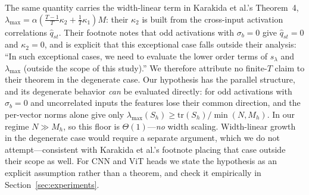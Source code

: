The same quantity carries the width-linear term in Karakida et al.'s
Theorem~4, $\lambda_{\max} = \alpha(\tfrac{T-1}{T}\kappa_2 +
\tfrac{1}{T}\kappa_1)M$: their $\kappa_2$ is built from the
cross-input activation correlations $\hat{q}_{st}$. Their footnote
notes that odd activations with $\sigma_b = 0$ give
$\hat{q}_{st} = 0$ and $\kappa_2 = 0$, and is explicit that this
exceptional case falls outside their analysis: ``In such
exceptional cases, we need to evaluate the lower order terms of
$s_\lambda$ and $\lambda_{\max}$ (outside the scope of this
study).'' We therefore attribute no finite-$T$ claim to their
theorem in the degenerate case. Our hypothesis has the parallel
structure, and its degenerate behavior \emph{can} be evaluated
directly: for odd activations with $\sigma_b = 0$ and uncorrelated
inputs the features lose their common direction, and the per-vector
norms alone give only $\lambda_{\max}(S_h) \geq
\mathrm{tr}(S_h)/\min(N, M_h)$. In our regime $N \gg M_h$, so this
floor is $\Theta(1)$---\emph{no} width scaling. Width-linear growth
in the degenerate case would require a separate argument, which we
do not attempt---consistent with Karakida et al.'s footnote placing
that case outside their scope as well. For CNN and ViT
heads we state the hypothesis as an explicit assumption rather than
a theorem, and check it empirically in
Section~\ref{sec:experiments}.

